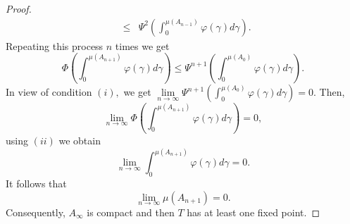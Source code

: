 \documentclass{amsart}
\theoremstyle{plain}
\numberwithin{equation}{section}
\begin{document}
\begin{proof}
\begin{eqnarray*}
&\leqslant &\Psi ^{2}\left( \int_{0}^{\mu \left( A_{n-1}\right) }\varphi
\left( \gamma \right) d\gamma \right) .
\end{eqnarray*}Repeating this process $n$ times we get\begin{equation*}
\Phi \left( \int_{0}^{\mu \left( A_{n+1}\right) }\varphi \left( \gamma
\right) d\gamma \right) \leqslant \Psi ^{n+1}\left( \int_{0}^{\mu \left(
A_{0}\right) }\varphi \left( \gamma \right) d\gamma \right) .
\end{equation*}In view of condition $\left( i\right) ,$ we get $\lim\limits_{n\rightarrow
\infty }\Psi ^{n+1}\left( \int_{0}^{\mu \left( A_{0}\right) }\varphi \left(
\gamma \right) d\gamma \right) =0$. Then,\begin{equation*}
\lim\limits_{n\rightarrow \infty }\Phi \left( \int_{0}^{\mu \left(
A_{n+1}\right) }\varphi \left( \gamma \right) d\gamma \right) =0,
\end{equation*}using $\left( ii\right) $ we obtain\begin{equation*}
\lim\limits_{n\rightarrow \infty }\int_{0}^{\mu \left( A_{n+1}\right)
}\varphi \left( \gamma \right) d\gamma =0.
\end{equation*}It follows that\begin{equation*}
\lim\limits_{n\rightarrow \infty }\mu \left( A_{n+1}\right) =0.
\end{equation*}Consequently, $A_{\infty }$ is compact and then $T$ has at least one fixed
point.
\end{proof}
\end{document}
